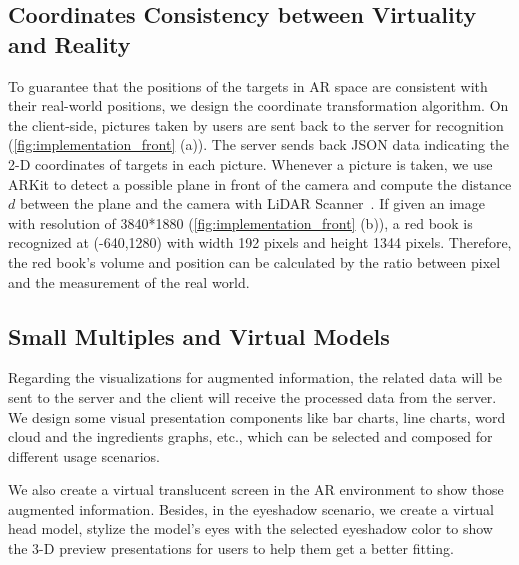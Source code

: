 

\subsection{Coordinates Consistency between Virtuality and Reality}

To guarantee that the positions of the targets in AR space are consistent with their real-world positions,
we design the coordinate transformation algorithm.
On the client-side, pictures taken by users are sent back to
the server for recognition  (\autoref{fig:implementation_front} (a)).
The server sends back JSON data indicating the 2-D coordinates of targets in each picture.
Whenever a picture is taken, we use ARKit to detect a possible plane
in front of the camera and compute the distance $d$ between the plane and the
camera with LiDAR Scanner~\cite{ARKit}.
If given an image with resolution of 3840*1880 (\autoref{fig:implementation_front} (b)),
a red book is recognized at (-640,1280) with width 192 pixels and height 1344 pixels.
Therefore, the red book's volume and position can be calculated by the ratio 
between pixel and the measurement of the real world.


\subsection{Small Multiples and Virtual Models}

Regarding the visualizations for augmented information,
the related data will be sent to the server and the client will
receive the processed data from the server.
We design some visual presentation components like bar charts, line charts,
word cloud and the ingredients graphs, etc.,
which can be selected and composed for different usage scenarios.

We also create a virtual translucent screen in the AR environment to
show those augmented information.
Besides, in the eyeshadow scenario, we create a virtual head model,
stylize the model's eyes with the selected eyeshadow color
to show the 3-D preview presentations for users to help them
get a better fitting.





